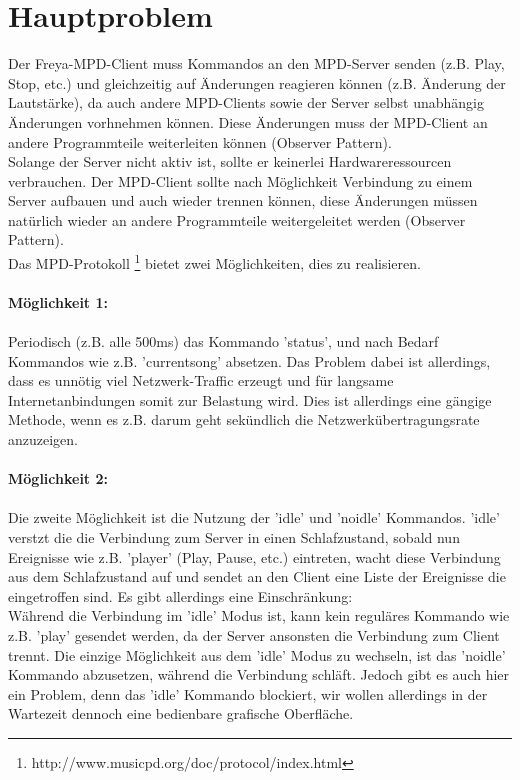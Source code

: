 \section{Hauptproblem}
Der Freya-MPD-Client muss Kommandos an den MPD-Server senden (z.B. Play, Stop, etc.) und  gleichzeitig auf 
Änderungen reagieren können (z.B. Änderung der Lautstärke), da auch andere MPD-Clients sowie der Server
selbst unabhängig Änderungen vorhnehmen können. Diese Änderungen muss der MPD-Client an andere Programmteile
weiterleiten können (Observer Pattern).\ \\
Solange der Server nicht aktiv ist, sollte er keinerlei Hardwareressourcen verbrauchen. Der MPD-Client sollte
nach Möglichkeit Verbindung zu einem Server aufbauen und auch wieder trennen können, diese Änderungen müssen
natürlich wieder an andere Programmteile weitergeleitet werden (Observer Pattern).\ \\
Das MPD-Protokoll \footnote{http://www.musicpd.org/doc/protocol/index.html} bietet zwei Möglichkeiten, dies zu 
realisieren.\ \\ \\
\textbf{Möglichkeit 1:}\ \\ \\
Periodisch (z.B. alle 500ms) das Kommando 'status', und nach Bedarf Kommandos wie z.B. 'currentsong' absetzen.
Das Problem dabei ist allerdings, dass es unnötig viel Netzwerk-Traffic erzeugt und für langsame Internetanbindungen
somit zur Belastung wird. Dies ist allerdings eine gängige Methode, wenn es z.B. darum geht sekündlich die 
Netzwerkübertragungsrate anzuzeigen.\ \\ \\
\textbf{Möglichkeit 2:}\ \\ \\
Die zweite Möglichkeit ist die Nutzung der 'idle' und 'noidle' Kommandos. 'idle' verstzt die die Verbindung zum Server
in einen Schlafzustand, sobald nun Ereignisse wie z.B. 'player' (Play, Pause, etc.) eintreten, wacht diese Verbindung
aus dem Schlafzustand auf und sendet an den Client eine Liste der Ereignisse die eingetroffen sind.
Es gibt allerdings eine Einschränkung:\ \\
Während die Verbindung im 'idle' Modus ist, kann kein reguläres Kommando wie z.B. 'play' gesendet werden, da der 
Server ansonsten die Verbindung zum Client trennt. Die einzige Möglichkeit aus dem 'idle' Modus zu wechseln, ist
das 'noidle' Kommando abzusetzen, während die Verbindung schläft. Jedoch gibt es auch hier ein Problem, denn das
'idle' Kommando blockiert, wir wollen allerdings in der Wartezeit dennoch eine bedienbare grafische Oberfläche.\ \\
